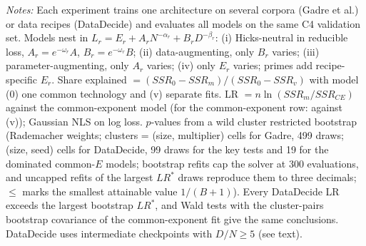 \begin{table}[!htbp]
\begin{threeparttable}
\begin{tabular}{lcccccc}
\bottomrule
\end{tabular}
\begin{tablenotes}[flushleft]
\footnotesize
\item \textit{Notes:} Each experiment trains one architecture on several corpora (Gadre et al.) or data recipes (DataDecide) and evaluates all models on the same C4 validation set. Models nest in $L_r=E_r+A_rN^{-\alpha_r}+B_rD^{-\beta_r}$: (i) Hicks-neutral in reducible loss, $A_r=e^{-\omega_r}A$, $B_r=e^{-\omega_r}B$; (ii) data-augmenting, only $B_r$ varies; (iii) parameter-augmenting, only $A_r$ varies; (iv) only $E_r$ varies; primes add recipe-specific $E_r$. Share explained $=(SSR_0-SSR_m)/(SSR_0-SSR_v)$ with model (0) one common technology and (v) separate fits. LR $=n\ln(SSR_m/SSR_{CE})$ against the common-exponent model (for the common-exponent row: against (v)); Gaussian NLS on log loss. $p$-values from a wild cluster restricted bootstrap (Rademacher weights; clusters = (size, multiplier) cells for Gadre, 499 draws; (size, seed) cells for DataDecide, 99 draws for the key tests and 19 for the dominated common-$E$ models; bootstrap refits cap the solver at 300 evaluations, and uncapped refits of the largest $LR^*$ draws reproduce them to three decimals; $\leq$ marks the smallest attainable value $1/(B+1)$). Every DataDecide LR exceeds the largest bootstrap $LR^*$, and Wald tests with the cluster-pairs bootstrap covariance of the common-exponent fit give the same conclusions. DataDecide uses intermediate checkpoints with $D/N\geq5$ (see text).
\end{tablenotes}
\end{threeparttable}
\end{table}
